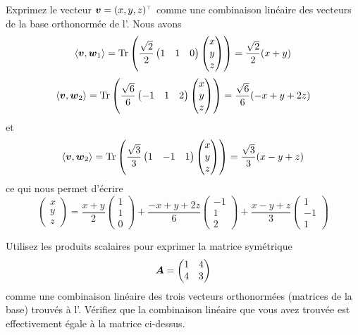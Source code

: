 \begin{exemple}
Exprimez le vecteur $\mat{v} = \transp{(x,y,z)}$ comme une combinaison linéaire des vecteurs
de la base orthonormée de l'.
\solution
Nous avons
\[
\langle\boldsymbol{v}, \boldsymbol{w}_1\rangle = \operatorname{Tr}\left(
\frac{\sqrt{2}}{2}\begin{pmatrix}
1 & 1 & 0
\end{pmatrix}\begin{pmatrix}
x \\ y \\ z
\end{pmatrix}\right) = \frac{\sqrt{2}}{2}(x+y)
\]
\[
\langle\boldsymbol{v}, \boldsymbol{w}_2\rangle = \operatorname{Tr}\left(
\frac{\sqrt{6}}{6}
\begin{pmatrix}
-1 & 1 & 2
\end{pmatrix}\begin{pmatrix}
x \\ y \\ z
\end{pmatrix}\right) = \frac{\sqrt{6}}{6}(-x+y+2z)
\]
et
\[
\langle\boldsymbol{v}, \boldsymbol{w}_2\rangle = \operatorname{Tr}\left(
\frac{\sqrt{3}}{3}
\begin{pmatrix}
1 & -1 & 1
\end{pmatrix}\begin{pmatrix}
x \\ y \\ z
\end{pmatrix}\right) = \frac{\sqrt{3}}{3}(x-y+z)
\]
ce qui nous permet d'écrire
\[
\begin{pmatrix}
x\\y\\z
\end{pmatrix}= \frac{x+y}{2} \begin{pmatrix}
1 \\ 1 \\ 0
\end{pmatrix}
+ \frac{-x+y+2z}{6} \begin{pmatrix}
-1 \\ 1 \\ 2
\end{pmatrix}
+ \frac{x-y+z}{3}\begin{pmatrix}
1 \\ -1 \\ 1
\end{pmatrix}
\]
\end{exemple}
\begin{exerciceB}
Utilisez les produits scalaires 
pour exprimer la matrice symétrique 
\[
\boldsymbol{A} = \begin{pmatrix}
1 & 4 \\ 4 & 3
\end{pmatrix}
\]
comme une combinaison linéaire des trois vecteurs orthonormées (matrices de la base) trouvés à
l'. Vérifiez que la combinaison linéaire que vous avez trouvée est
effectivement égale à la matrice ci-dessus.
\end{exerciceB}


